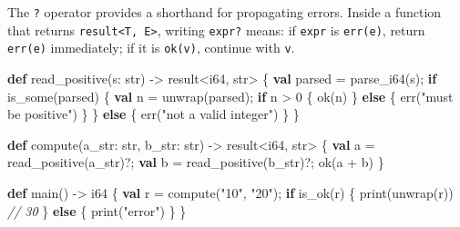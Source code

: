 \documentclass[
  english,
]{book}
\newenvironment{Shaded}{\begin{snugshade}}{\end{snugshade}}
\newcommand{\CommentTok}[1]{\textcolor[rgb]{0.42,0.60,0.33}{\textit{#1}}}
\newcommand{\ControlFlowTok}[1]{\textcolor[rgb]{0.77,0.53,0.75}{\textbf{#1}}}
\newcommand{\DataTypeTok}[1]{\textcolor[rgb]{0.31,0.79,0.69}{#1}}
\newcommand{\DecValTok}[1]{\textcolor[rgb]{0.71,0.81,0.66}{#1}}
\newcommand{\FunctionTok}[1]{\textcolor[rgb]{0.86,0.86,0.67}{#1}}
\newcommand{\KeywordTok}[1]{\textcolor[rgb]{0.34,0.61,0.84}{\textbf{#1}}}
\newcommand{\NormalTok}[1]{\textcolor[rgb]{0.83,0.83,0.83}{#1}}
\newcommand{\OperatorTok}[1]{\textcolor[rgb]{0.83,0.83,0.83}{#1}}
\newcommand{\StringTok}[1]{\textcolor[rgb]{0.81,0.57,0.47}{#1}}
\begin{document}
The \texttt{?} operator provides a shorthand for propagating errors.
Inside a function that returns
\texttt{result\textless{}T,\ E\textgreater{}}, writing \texttt{expr?}
means: if \texttt{expr} is \texttt{err(e)}, return \texttt{err(e)}
immediately; if it is \texttt{ok(v)}, continue with \texttt{v}.

\begin{Shaded}
\begin{Highlighting}[]
\KeywordTok{def}\NormalTok{ read\_positive(s: }\DataTypeTok{str}\NormalTok{) }\OperatorTok{{-}\textgreater{}} \DataTypeTok{result}\OperatorTok{\textless{}}\DataTypeTok{i64}\NormalTok{, }\DataTypeTok{str}\OperatorTok{\textgreater{}}\NormalTok{ \{}
    \KeywordTok{val}\NormalTok{ parsed }\OperatorTok{=} \FunctionTok{parse\_i64}\NormalTok{(s);}
    \ControlFlowTok{if} \FunctionTok{is\_some}\NormalTok{(parsed) \{}
        \KeywordTok{val}\NormalTok{ n }\OperatorTok{=}\NormalTok{ unwrap(parsed);}
        \ControlFlowTok{if}\NormalTok{ n }\OperatorTok{\textgreater{}} \DecValTok{0}\NormalTok{ \{}
            \FunctionTok{ok}\NormalTok{(n)}
\NormalTok{        \} }\ControlFlowTok{else}\NormalTok{ \{}
            \FunctionTok{err}\NormalTok{(}\StringTok{"must be positive"}\NormalTok{)}
\NormalTok{        \}}
\NormalTok{    \} }\ControlFlowTok{else}\NormalTok{ \{}
        \FunctionTok{err}\NormalTok{(}\StringTok{"not a valid integer"}\NormalTok{)}
\NormalTok{    \}}
\NormalTok{\}}

\KeywordTok{def}\NormalTok{ compute(a\_str: }\DataTypeTok{str}\NormalTok{, b\_str: }\DataTypeTok{str}\NormalTok{) }\OperatorTok{{-}\textgreater{}} \DataTypeTok{result}\OperatorTok{\textless{}}\DataTypeTok{i64}\NormalTok{, }\DataTypeTok{str}\OperatorTok{\textgreater{}}\NormalTok{ \{}
    \KeywordTok{val}\NormalTok{ a }\OperatorTok{=}\NormalTok{ read\_positive(a\_str)}\OperatorTok{?}\NormalTok{;}
    \KeywordTok{val}\NormalTok{ b }\OperatorTok{=}\NormalTok{ read\_positive(b\_str)}\OperatorTok{?}\NormalTok{;}
    \FunctionTok{ok}\NormalTok{(a }\OperatorTok{+}\NormalTok{ b)}
\NormalTok{\}}

\KeywordTok{def}\NormalTok{ main() }\OperatorTok{{-}\textgreater{}} \DataTypeTok{i64}\NormalTok{ \{}
    \KeywordTok{val}\NormalTok{ r }\OperatorTok{=}\NormalTok{ compute(}\StringTok{"10"}\NormalTok{, }\StringTok{"20"}\NormalTok{);}
    \ControlFlowTok{if} \FunctionTok{is\_ok}\NormalTok{(r) \{}
        \FunctionTok{print}\NormalTok{(unwrap(r))   }\CommentTok{// 30}
\NormalTok{    \} }\ControlFlowTok{else}\NormalTok{ \{}
        \FunctionTok{print}\NormalTok{(}\StringTok{"error"}\NormalTok{)}
\NormalTok{    \}}
\NormalTok{\}}
\end{Highlighting}
\end{Shaded}
\end{document}

